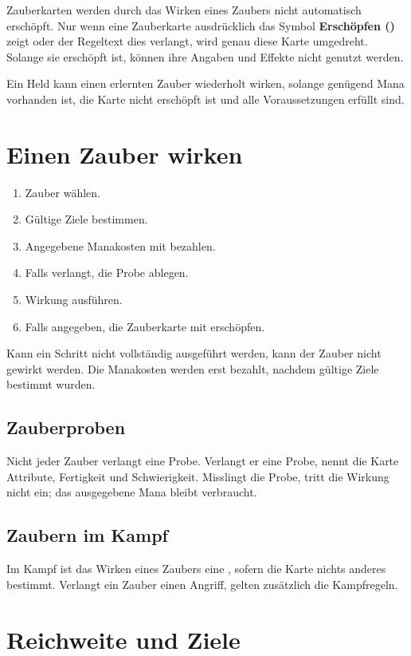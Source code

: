 Zauberkarten werden durch das Wirken eines Zaubers nicht automatisch erschöpft. Nur wenn eine Zauberkarte ausdrücklich das Symbol \textbf{Erschöpfen (\exhaust)} zeigt oder der Regeltext dies verlangt, wird genau diese Karte umgedreht. Solange sie erschöpft ist, können ihre Angaben und Effekte nicht genutzt werden.

Ein Held kann einen erlernten Zauber wiederholt wirken, solange genügend Mana vorhanden ist, die Karte nicht erschöpft ist und alle Voraussetzungen erfüllt sind.

\section{Einen Zauber wirken}

\begin{enumerate}
  \item Zauber wählen.
  \item Gültige Ziele bestimmen.
  \item Angegebene Manakosten mit \manaLoss{} bezahlen.
  \item Falls verlangt, die Probe ablegen.
  \item Wirkung ausführen.
  \item Falls angegeben, die Zauberkarte mit \exhaust{} erschöpfen.
\end{enumerate}

Kann ein Schritt nicht vollständig ausgeführt werden, kann der Zauber nicht gewirkt werden. Die Manakosten werden erst bezahlt, nachdem gültige Ziele bestimmt wurden.

\subsection{Zauberproben}

Nicht jeder Zauber verlangt eine Probe. Verlangt er eine Probe, nennt die Karte Attribute, Fertigkeit und Schwierigkeit. Misslingt die Probe, tritt die Wirkung nicht ein; das ausgegebene Mana bleibt verbraucht.

\subsection{Zaubern im Kampf}

Im Kampf ist das Wirken eines Zaubers eine \standardAction, sofern die Karte nichts anderes bestimmt. Verlangt ein Zauber einen Angriff, gelten zusätzlich die Kampfregeln.

\section{Reichweite und Ziele}

